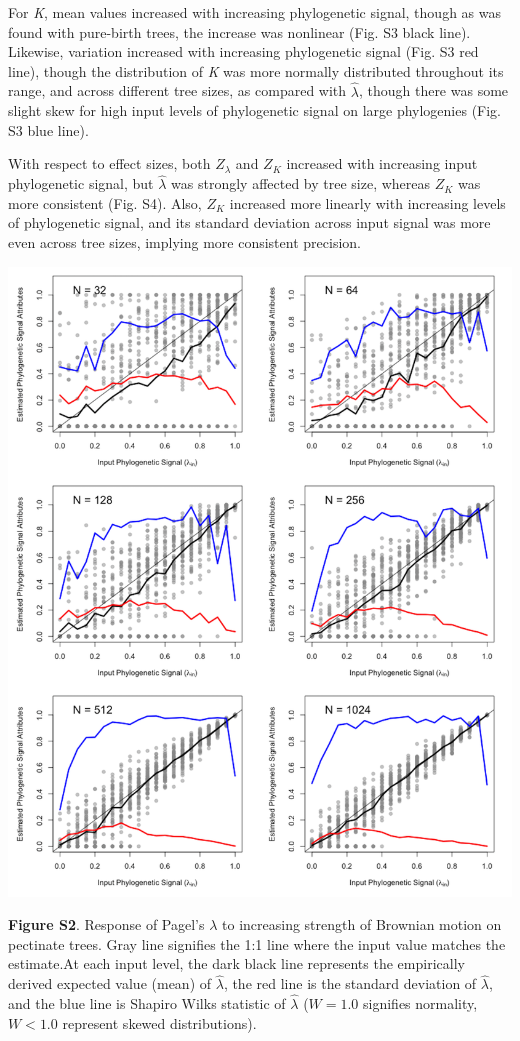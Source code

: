 \documentclass[
]{article}
\begin{document}
For \emph{K}, mean values increased with increasing phylogenetic signal,
though as was found with pure-birth trees, the increase was nonlinear
(Fig. S3 black line). Likewise, variation increased with increasing
phylogenetic signal (Fig. S3 red line), though the distribution of
\emph{K} was more normally distributed throughout its range, and across
different tree sizes, as compared with \(\hat{\lambda}\), though there
was some slight skew for high input levels of phylogenetic signal on
large phylogenies (Fig. S3 blue line). \hfill\break

With respect to effect sizes, both \(Z_{\lambda}\) and \(Z_K\) increased
with increasing input phylogenetic signal, but \(\hat{\lambda}\) was
strongly affected by tree size, whereas \(Z_K\) was more consistent
(Fig. S4). Also, \(Z_K\) increased more linearly with increasing levels
of phylogenetic signal, and its standard deviation across input signal
was more even across tree sizes, implying more consistent precision.

\includegraphics[width=0.95\linewidth]{fig.S2}

\textbf{Figure S2}. Response of Pagel's \(\lambda\) to increasing
strength of Brownian motion on pectinate trees. Gray line signifies the
1:1 line where the input value matches the estimate.At each input level,
the dark black line represents the empirically derived expected value
(mean) of \(\hat\lambda\), the red line is the standard deviation of
\(\hat\lambda\), and the blue line is Shapiro Wilks statistic of
\(\hat\lambda\) (\(W=1.0\) signifies normality, \(W< 1.0\) represent
skewed distributions).
\end{document}
